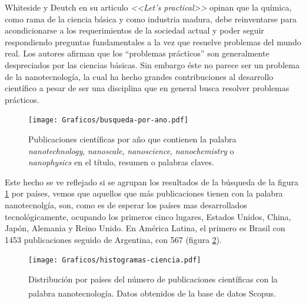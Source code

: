 	 Whiteside y Deutch en su articulo \textit{<<Let's practical>>} opinan que la química, como rama de la ciencia básica y como industria madura, debe reinventarse para acondicionarse a los requerimientos de la sociedad actual y poder seguir respondiendo preguntas fundamentales a la vez que resuelve problemas del mundo real. Los autores afirman que los ``problemas prácticos'' son generalmente despreciados por las ciencias básicas. \cite{Burdass2010} Sin embargo éste no parece ser un problema de la nanotecnología, la cual ha hecho grandes contribuciones al desarrollo científico a pesar de ser una disciplina que en general busca resolver problemas prácticos.
			
 			\begin{figure}[ht!]
 			\begin{center}
 			\hspace{0.3cm}\texttt{[image: Graficos/busqueda-por-ano.pdf]}
 			\vspace*{-0.6cm}
 			\caption[Publicaciones por año en nanotecnología]{Publicaciones científicas por año que contienen la palabra \textit{nanotechnology}, \textit{nanoscale}, \textit{nanoscience}, \textit{nanochemistry} o \textit{nanophysics} en el título, resumen o palabras claves.}
 			\label{fig:publicaciones-ano}
 			\vspace*{-0.2cm} 		    
 			\end{center}
 		    \end{figure}

	 Este hecho se ve reflejado si se agrupan los resultados de la búsqueda de la figura \ref{fig:publicaciones-ano} por países, vemos que aquellos que más publicaciones tienen con la palabra nanotecnolgía, son, como es de esperar los países mas desarrollados tecnológicamente, ocupando los primeros cinco lugares, Estados Unidos, China, Japón, Alemania y Reino Unido. En América Latina, el primero es Brasil con 1453 publicaciones seguido de Argentina, con 567 (figura \ref{fig:paises}).

			\begin{figure}[b!]
 				\begin{center}
 				\texttt{[image: Graficos/histogramas-ciencia.pdf]}
 				\vspace*{-0.4cm}
 				\caption[Nanotecnología por países]{Distribución por países del número de publicaciones científicas con la palabra nanotecnología. Datos obtenidos de la base de datos Scopus\textsuperscript\textregistered.}
 				\label{fig:paises}
 		    	\end{center}
 		    	\end{figure}

